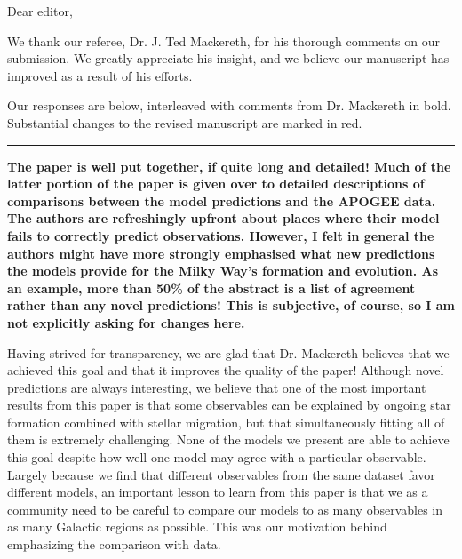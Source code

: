 \documentclass{report}
\newcommand{\breakline}{\noindent\rule{\textwidth}{1pt}}
\begin{document}
 
Dear editor, 
\par\null\par 
We thank our referee, Dr. J. Ted Mackereth, for his thorough comments on our 
submission. 
We greatly appreciate his insight, and we believe our manuscript 
has improved as a result of his efforts. 
\par
Our responses are below, interleaved with comments from Dr. Mackereth in 
bold. 
Substantial changes to the revised manuscript are marked in red. 

\par\null\par 
\breakline 
\par\null\par 
\textbf{
	The paper is well put together, if quite long and detailed! 
	Much of the latter portion of the paper is given over to detailed 
	descriptions of comparisons between the model predictions and the APOGEE 
	data. 
	The authors are refreshingly upfront about places where their model fails 
	to correctly predict observations. 
	However, I felt in general the authors might have more strongly emphasised 
	what new predictions the models provide for the Milky Way's formation and 
	evolution. 
	As an example, more than 50\% of the abstract is a list of agreement rather 
	than any novel predictions! 
	This is subjective, of course, so I am not explicitly asking for changes 
	here.
} 
\par 
Having strived for transparency, we are glad that Dr. Mackereth believes that 
we achieved this goal and that it improves the quality of the paper! 
Although novel predictions are always interesting, we believe that one of the 
most important results from this paper is that some observables can be 
explained by ongoing star formation combined with stellar migration, but that 
simultaneously fitting all of them is extremely challenging. 
None of the models we present are able to achieve this goal despite how well 
one model may agree with a particular observable. 
Largely because we find that different observables from the same dataset favor 
different models, an important lesson to learn from this paper is that we as a 
community need to be careful to compare our models to as many observables in as 
many Galactic regions as possible. 
This was our motivation behind emphasizing the comparison with data. 
\end{document}
